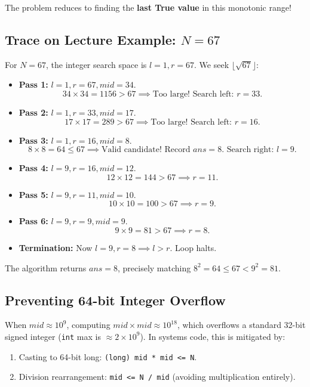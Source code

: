 \documentclass[10pt,journal,compsoc,onecolumn]{IEEEtran}
\begin{document}
The problem reduces to finding the \textbf{last True value} in this monotonic range!

\subsection{Trace on Lecture Example: $N = 67$}

For $N = 67$, the integer search space is $l = 1, r = 67$. We seek $\lfloor\sqrt{67}\rfloor$:
\begin{itemize}
    \item \textbf{Pass 1:} $l = 1, r = 67, mid = 34$.
    \[
    34 \times 34 = 1156 > 67 \implies \text{Too large! Search left: } r = 33.
    \]
    \item \textbf{Pass 2:} $l = 1, r = 33, mid = 17$.
    \[
    17 \times 17 = 289 > 67 \implies \text{Too large! Search left: } r = 16.
    \]
    \item \textbf{Pass 3:} $l = 1, r = 16, mid = 8$.
    \[
    8 \times 8 = 64 \le 67 \implies \text{Valid candidate! Record } ans = 8. \text{ Search right: } l = 9.
    \]
    \item \textbf{Pass 4:} $l = 9, r = 16, mid = 12$.
    \[
    12 \times 12 = 144 > 67 \implies r = 11.
    \]
    \item \textbf{Pass 5:} $l = 9, r = 11, mid = 10$.
    \[
    10 \times 10 = 100 > 67 \implies r = 9.
    \]
    \item \textbf{Pass 6:} $l = 9, r = 9, mid = 9$.
    \[
    9 \times 9 = 81 > 67 \implies r = 8.
    \]
    \item \textbf{Termination:} Now $l = 9, r = 8 \implies l > r$. Loop halts.
\end{itemize}
The algorithm returns \textbf{$ans = 8$}, precisely matching $8^2 = 64 \le 67 < 9^2 = 81$.

\subsection{Preventing 64-bit Integer Overflow}

When $mid \approx 10^9$, computing $mid \times mid \approx 10^{18}$, which overflows a standard 32-bit signed integer (\texttt{int} max is $\approx 2 \times 10^9$). In systems code, this is mitigated by:
\begin{enumerate}
    \item Casting to 64-bit long: \verb|(long) mid * mid <= N|.
    \item Division rearrangement: \verb|mid <= N / mid| (avoiding multiplication entirely).
\end{enumerate}
\end{document}
